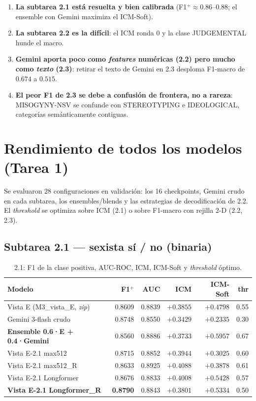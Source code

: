 \documentclass[11pt,a4paper]{article}
\newcommand{\best}[1]{\textbf{#1}}
\begin{document}
\begin{finding}
\begin{enumerate}\itemsep1pt
  \item \textbf{La subtarea 2.1 está resuelta y bien calibrada} (F1$^{+}\approx0.86$--$0.88$; el
  ensemble con Gemini maximiza el ICM-Soft).
  \item \textbf{La subtarea 2.2 es la difícil}: el ICM ronda 0 y la clase JUDGEMENTAL hunde el macro.
  \item \textbf{Gemini aporta poco como \emph{features} numéricas (2.2) pero mucho como \emph{texto}
  (2.3)}: retirar el texto de Gemini en 2.3 desploma F1-macro de $0.674$ a $0.515$.
  \item \textbf{El peor F1 de 2.3 se debe a confusión de frontera, no a rareza}: MISOGYNY-NSV se
  confunde con STEREOTYPING e IDEOLOGICAL, categorías semánticamente contiguas.
\end{enumerate}
\end{finding}

\section{Rendimiento de todos los modelos (Tarea 1)}

Se evaluaron 28 configuraciones en validación: los 16 checkpoints, Gemini crudo en cada subtarea,
los ensembles/blends y las estrategias de decodificación de 2.2. El \emph{threshold} se optimiza
sobre ICM (2.1) o sobre F1-macro con rejilla 2-D (2.2, 2.3).

\subsection{Subtarea 2.1 --- sexista sí / no (binaria)}
\begin{table}[h]\centering\small
\caption{2.1: F1 de la clase positiva, AUC-ROC, ICM, ICM-Soft y \emph{threshold} óptimo.}
\begin{tabular}{@{}lrrrrr@{}}
\toprule
Modelo & F1$^{+}$ & AUC & ICM & ICM-Soft & thr \\
\midrule
Vista E (M3\_vista\_E, \emph{zip}) & 0.8609 & 0.8839 & $+0.3855$ & $+0.4798$ & 0.55 \\
Gemini 3-flash crudo               & 0.8748 & 0.8550 & $+0.3429$ & $+0.2335$ & 0.30 \\
\best{Ensemble 0.6·E + 0.4·Gemini} & 0.8560 & 0.8886 & $+0.3733$ & \best{$+0.5957$} & 0.67 \\
Vista E-2.1 max512                 & 0.8715 & 0.8852 & $+0.3944$ & $+0.3025$ & 0.60 \\
Vista E-2.1 max512\_R              & 0.8633 & 0.8925 & \best{$+0.4088$} & $+0.3878$ & 0.61 \\
Vista E-2.1 Longformer             & 0.8676 & 0.8833 & $+0.4008$ & $+0.5428$ & 0.57 \\
\best{Vista E-2.1 Longformer\_R}   & \best{0.8790} & 0.8843 & $+0.3801$ & $+0.5334$ & 0.50 \\
\bottomrule
\end{tabular}
\end{table}
\end{document}
